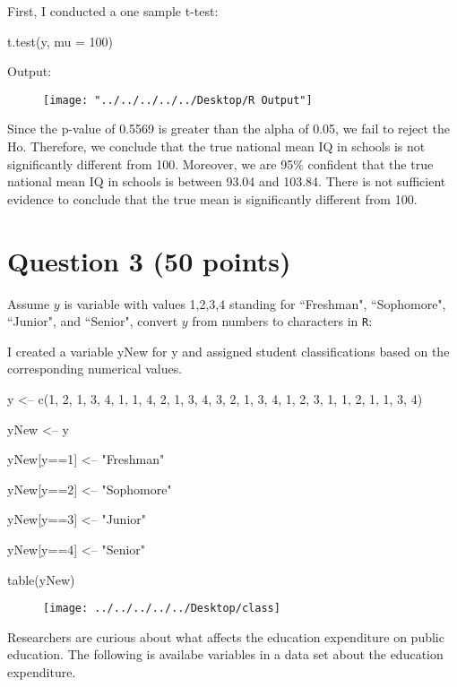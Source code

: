 \documentclass[12pt,letterpaper]{article}
\begin{document}
\noindent First, I conducted a one sample t-test: 

t.test(y, mu = 100)

\vspace{.5cm}
\noindent Output:
\begin{figure} [h]
	\centering
	\texttt{[image: "../../../../../Desktop/R Output"]}
	\label{fig:r-output}
\end{figure}

\noindent Since the p-value of 0.5569 is greater than the alpha of 0.05, we fail to reject the Ho. Therefore, we conclude that the true national mean IQ in schools is not significantly different from 100. Moreover, we are 95\% confident that the true national mean IQ in schools is between 93.04 and 103.84. There is not sufficient evidence to conclude that the true mean is significantly different from 100.

\vspace{1cm}
	\section*{Question 3 (50 points)}
Assume $y$ is variable with values 1,2,3,4 standing for ``Freshman", ``Sophomore", ``Junior", and ``Senior", convert $y$ from numbers to characters in \texttt{R}:
\vspace{.5cm}


\noindent I created a variable yNew for y and assigned student classifications based on the corresponding numerical values.

y <-- c(1, 2, 1, 3, 4, 1, 1, 4, 2, 1, 3, 4, 3, 2, 1, 3, 4, 1, 2, 3, 1, 1, 2, 1, 1, 3, 4)

yNew <-- y 

yNew[y==1] <-- "Freshman"

yNew[y==2] <-- "Sophomore"

yNew[y==3] <-- "Junior"

yNew[y==4] <-- "Senior"

table(yNew)

\begin{figure} [h]
	\centering
	\texttt{[image: ../../../../../Desktop/class]}
	\label{fig:class}
\end{figure}


\vspace{.5cm}

\noindent Researchers are curious about what affects the education expenditure on public education. The following is availabe variables in a data set about the education expenditure. \\
\vspace{.5cm}
\end{document}

